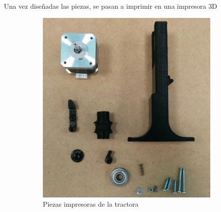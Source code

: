 Una vez diseñadas las piezas, se pasan a imprimir en una impresora 3D

\begin{figure}[H]
    \centering
    \begin{subfigure}[b]{0.3\textwidth}
        \centering
        \includegraphics[width=\linewidth]{images/producciones/tractora/IMG_20150804_085937.jpg}
        \caption{Piezas impresoras de la tractora}
        \label{fig:tractora_piezas}
    \end{subfigure}
    ~
    \begin{subfigure}[b]{0.3\textwidth}
            \centering

\end{subfigure}
\end{figure}
